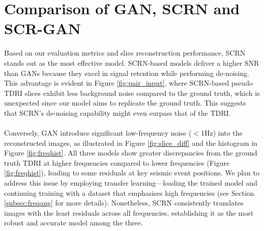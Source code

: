 
\section{Comparison of GAN, SCRN and SCR-GAN}
Based on our evaluation metrics and slice reconstruction performance, SCRN stands out as the most effective model. SCRN-based models deliver a higher SNR than GANs because they excel in signal retention while performing de-noising. This advantage is evident in Figure \ref{fig:pair_input}, where SCRN-based pseudo TDRI slices exhibit less background noise compared to the ground truth, which is unexpected since our model aims to replicate the ground truth. This suggests that SCRN's de-noising capability might even surpass that of the TDRI.
\\\\
Conversely, GAN introduce significant low-frequency noise ($<$1Hz) into the reconstructed images, as illustrated in Figure \ref{fig:slice_diff} and the histogram in Figure \ref{fig:freqhist}. All three models show greater discrepancies from the ground truth TDRI at higher frequencies compared to lower frequencies (Figure \ref{fig:freqhist}), leading to some residuals at key seismic event positions. We plan to address this issue by employing transfer learning—loading the trained model and continuing training with a dataset that emphasises high frequencies (see Section \ref{subsec:freqaug} for more details). Nonetheless, SCRN consistently translates images with the least residuals across all frequencies, establishing it as the most robust and accurate model among the three.

%

